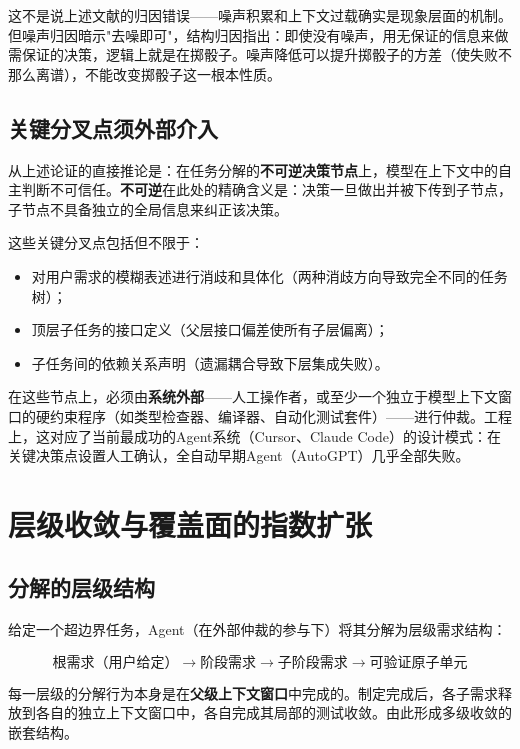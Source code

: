 \documentclass[11pt,a4paper]{ctexart}
\begin{document}
这不是说上述文献的归因错误——噪声积累和上下文过载确实是现象层面的机制。但噪声归因暗示"去噪即可"，结构归因指出：即使没有噪声，用无保证的信息来做需保证的决策，逻辑上就是在掷骰子。噪声降低可以提升掷骰子的方差（使失败不那么离谱），不能改变掷骰子这一根本性质。

\subsection{关键分叉点须外部介入}

从上述论证的直接推论是：在任务分解的\textbf{不可逆决策节点}上，模型在上下文中的自主判断不可信任。\textbf{不可逆}在此处的精确含义是：决策一旦做出并被下传到子节点，子节点不具备独立的全局信息来纠正该决策。

这些关键分叉点包括但不限于：
\begin{itemize}[leftmargin=*]
    \item 对用户需求的模糊表述进行消歧和具体化（两种消歧方向导致完全不同的任务树）；
    \item 顶层子任务的接口定义（父层接口偏差使所有子层偏离）；
    \item 子任务间的依赖关系声明（遗漏耦合导致下层集成失败）。
\end{itemize}

在这些节点上，必须由\textbf{系统外部}——人工操作者，或至少一个独立于模型上下文窗口的硬约束程序（如类型检查器、编译器、自动化测试套件）——进行仲裁。工程上，这对应了当前最成功的Agent系统（Cursor、Claude Code）的设计模式：在关键决策点设置人工确认，全自动早期Agent（AutoGPT）几乎全部失败。


\section{层级收敛与覆盖面的指数扩张}

\subsection{分解的层级结构}

给定一个超边界任务，Agent（在外部仲裁的参与下）将其分解为层级需求结构：

\[
\text{根需求（用户给定）} \longrightarrow \text{阶段需求} \longrightarrow \text{子阶段需求} \longrightarrow \text{可验证原子单元}
\]

每一层级的分解行为本身是在\textbf{父级上下文窗口}中完成的。制定完成后，各子需求释放到各自的独立上下文窗口中，各自完成其局部的测试收敛。由此形成多级收敛的嵌套结构。
\end{document}
